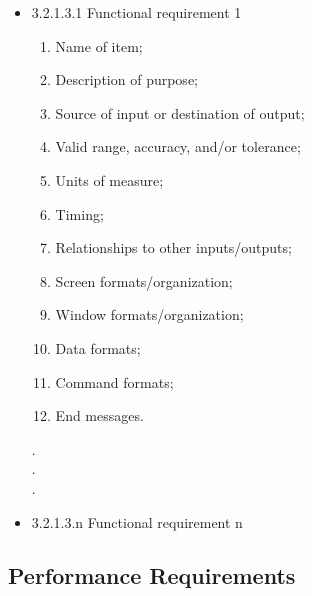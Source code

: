 \documentclass[compsoc,draftclsnofoot,onecolumn,10pt]{IEEEtran}
\begin{document}
	\begin{itemize}
		\item[]{3.2.1.3.1 Functional requirement 1}~\\
		\begin{enumerate}
			\item Name of item;
			\item Description of purpose;
			\item Source of input or destination of output;
			\item Valid range, accuracy, and/or tolerance;
			\item Units of measure;
			\item Timing;
			\item Relationships to other inputs/outputs;
			\item Screen formats/organization;
			\item Window formats/organization;
			\item Data formats;
			\item Command formats;
			\item End messages.
		\end{enumerate}
			.\\
			.\\
			.\\
		\item[]{3.2.1.3.n Functional requirement n}~\\
	\end{itemize}


\subsection{Performance Requirements}
%
%
%
%
%
%
%
%
%
\end{document}
